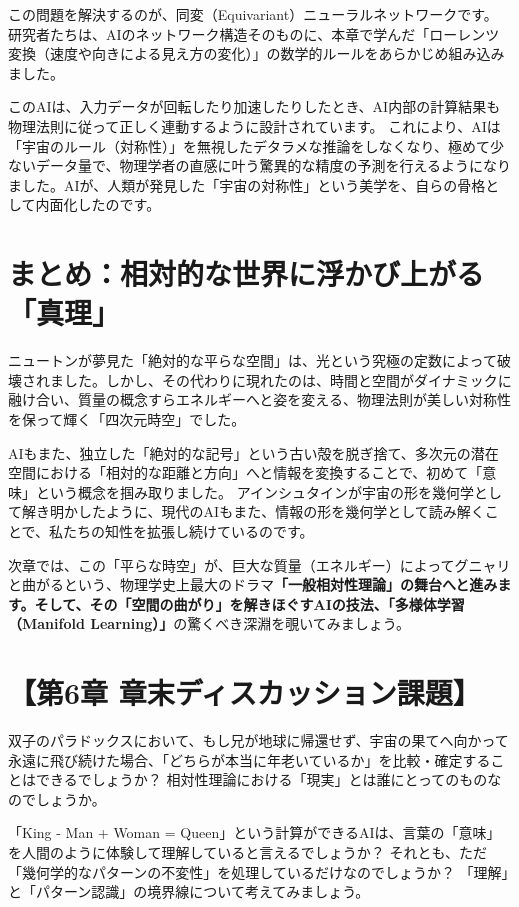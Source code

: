 この問題を解決するのが、同変（Equivariant）ニューラルネットワークです。 研究者たちは、AIのネットワーク構造そのものに、本章で学んだ「ローレンツ変換（速度や向きによる見え方の変化）」の数学的ルールをあらかじめ組み込みました。

このAIは、入力データが回転したり加速したりしたとき、AI内部の計算結果も物理法則に従って正しく連動するように設計されています。 これにより、AIは「宇宙のルール（対称性）」を無視したデタラメな推論をしなくなり、極めて少ないデータ量で、物理学者の直感に叶う驚異的な精度の予測を行えるようになりました。AIが、人類が発見した「宇宙の対称性」という美学を、自らの骨格として内面化したのです。

\section{まとめ：相対的な世界に浮かび上がる「真理」}

ニュートンが夢見た「絶対的な平らな空間」は、光という究極の定数によって破壊されました。しかし、その代わりに現れたのは、時間と空間がダイナミックに融け合い、質量の概念すらエネルギーへと姿を変える、物理法則が美しい対称性を保って輝く「四次元時空」でした。

AIもまた、独立した「絶対的な記号」という古い殻を脱ぎ捨て、多次元の潜在空間における「相対的な距離と方向」へと情報を変換することで、初めて「意味」という概念を掴み取りました。 アインシュタインが宇宙の形を幾何学として解き明かしたように、現代のAIもまた、情報の形を幾何学として読み解くことで、私たちの知性を拡張し続けているのです。

次章では、この「平らな時空」が、巨大な質量（エネルギー）によってグニャリと曲がるという、物理学史上最大のドラマ\textbf{「一般相対性理論」の舞台へと進みます。そして、その「空間の曲がり」を解きほぐすAIの技法、「多様体学習（Manifold Learning）」}の驚くべき深淵を覗いてみましょう。

\section*{【第6章 章末ディスカッション課題】}

双子のパラドックスにおいて、もし兄が地球に帰還せず、宇宙の果てへ向かって永遠に飛び続けた場合、「どちらが本当に年老いているか」を比較・確定することはできるでしょうか？ 相対性理論における「現実」とは誰にとってのものなのでしょうか。

「King - Man + Woman = Queen」という計算ができるAIは、言葉の「意味」を人間のように体験して理解していると言えるでしょうか？ それとも、ただ「幾何学的なパターンの不変性」を処理しているだけなのでしょうか？ 「理解」と「パターン認識」の境界線について考えてみましょう。





